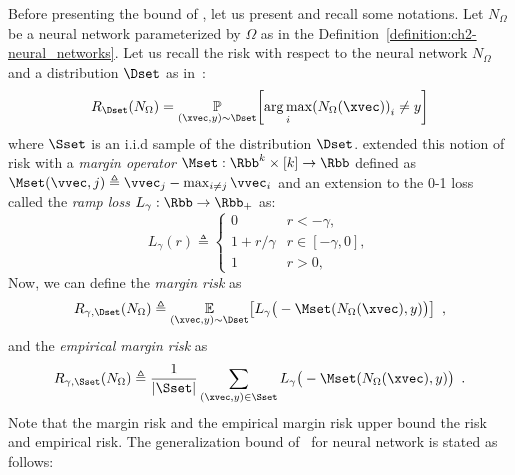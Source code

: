 Before presenting the bound of \citet{bartlett2017spectrally}, let us present and recall some notations.
Let $N_\Omega$ be a neural network parameterized by $\Omega$ as in the Definition~\ref{definition:ch2-neural_networks}.
Let us recall the risk with respect to the neural network $N_\Omega$ and a distribution $\Dset$ as in~:
\begin{equation}
  R_\Dset(N_\Omega) = \Pbb_{(\xvec, y) \sim \Dset} \left[ \argmax_i \left( N_\Omega(\xvec) \right)_i \neq y \right]
\end{equation}
where $\Sset$ is an i.i.d sample of the distribution $\Dset$.
\citet{bartlett2017spectrally} extended this notion of risk with a \emph{margin operator} $\Mset: \Rbb^k \times [k] \rightarrow \Rbb$ defined as $\Mset(\vvec, j) \triangleq \vvec_j - \max_{i \neq j} \vvec_i$ and an extension to the 0-1 loss called the \emph{ramp loss} $L_\gamma: \Rbb \rightarrow \Rbb_+$ as:
\begin{equation}
  L_\gamma(r) \triangleq 
  \begin{cases}
    0 &r< -\gamma, \\
    1 + r/\gamma &r \in [-\gamma,0], \\
    1 & r > 0,
  \end{cases}
\end{equation}
Now, we can define the \emph{margin risk} as 
\begin{equation} \label{equation:ch2-margin_risk}
  R_{\gamma,\Dset} (N_\Omega) \triangleq \Ebb_{(\xvec, y) \sim \Dset} \left[ L_\gamma \big(-\Mset(N_\Omega(\xvec), y) \big) \right] \enspace,
\end{equation}
and the \emph{empirical margin risk} as 
\begin{equation} \label{equation:ch2-emprical_margin_risk}
  R_{\gamma,\Sset} (N_\Omega) \triangleq \frac{1}{|\Sset|} \sum_{(\xvec, y) \in \Sset} L_\gamma \big(-\Mset(N_\Omega(\xvec), y) \big) \enspace.
\end{equation}
Note that the margin risk and the empirical margin risk upper bound the risk and empirical risk.
The generalization bound of~\citet{bartlett2017spectrally} for neural network is stated as follows:
